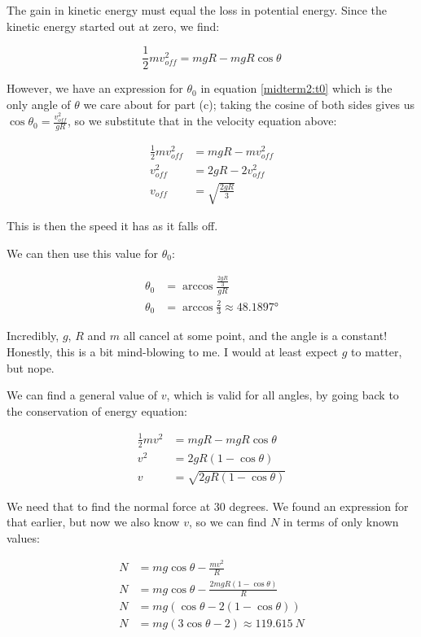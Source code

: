 \documentclass[8.01x]{subfiles}
\begin{document}
The gain in kinetic energy must equal the loss in potential energy. Since the kinetic energy started out at zero, we find:

\begin{equation}
\frac{1}{2} m v_{off}^2 = m g R - m g R \cos \theta
\end{equation}

However, we have an expression for $\theta_0$ in equation \eqref{midterm2:t0} which is the only angle of  $\theta$ we care about for part (c); taking the cosine of both sides gives us $\displaystyle \cos \theta_0 = \frac{v_{off}^2}{g R}$, so we substitute that in the velocity equation above:

\begin{align}
\frac{1}{2} m v_{off}^2 &= m g R - m v_{off}^2\\
v_{off}^2 &= 2 g R - 2v_{off}^2\\
v_{off} &= \sqrt{\frac{2 g R}{3}}
\end{align}

This is then the speed it has as it falls off. 

We can then use this value for $\theta_0$:

\begin{align}
\theta_0 &= \arccos \frac{\frac{2 g R}{3}}{g R}\\
\theta_0 &= \arccos \frac{2}{3} \approx \ang{48.1897}
\end{align}

Incredibly, $g$, $R$ and $m$ all cancel at some point, and the angle is a constant! Honestly, this is a bit mind-blowing to me. I would at least expect $g$ to matter, but nope.

We can find a general value of $v$, which is valid for all angles, by going back to the conservation of energy equation:

\begin{align}
\frac{1}{2} m v^2 &= m g R - m g R \cos \theta\\
v^2 &= 2 g R (1- \cos \theta)\\
v &= \sqrt{2 g R (1- \cos \theta)}
\end{align}

We need that to find the normal force at 30 degrees. We found an expression for that earlier, but now we also know $v$, so we can find $N$ in terms of only known values:

\begin{align}
N &= m g \cos \theta - \frac{m v^2}{R}\\
N &= m g \cos \theta - \frac{2 m g R (1 - \cos \theta)}{R}\\
N &= m g (\cos \theta - 2 (1 - \cos \theta))\\
N &= m g (3\cos \theta - 2) \approx \SI{119.615}{N}
\end{align}
\end{document}
